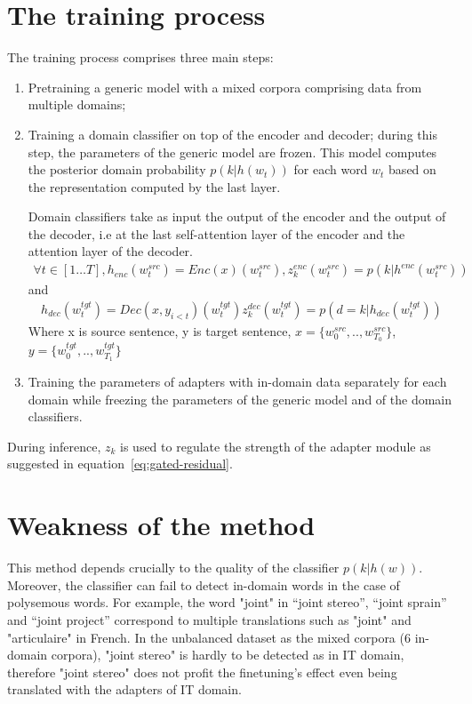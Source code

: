 \documentclass[12pt,times,a4paper,twoside]{article}
\newcommand{\fyTodo}[1]{\Todo[FY:]{\textcolor{orange}{#1}}}
\newcommand{\fyDone}[1]{\done[FY]\Todo[FY:]{\textcolor{orange}{#1}}}
\theoremstyle{definition}
\begin{document}
\section*{The training process}
The training process comprises three main steps:
\begin{enumerate}
\item Pretraining a generic model with a mixed corpora comprising data from multiple domains;
\item Training a domain classifier on top of the encoder and decoder; during this step, the parameters of the generic model are frozen. This model computes the posterior domain probability $p(k|h(w_t))$ for each word $w_t$ based on the representation computed by the last layer.
  
  Domain classifiers take as input the output of the encoder and the output of the decoder, i.e at the last self-attention layer of the encoder and the attention layer of the decoder. \fyDone{Next sentence is a repetition}
  \begin{align}
    \forall t \in [1 \dots T], h_{enc}(w^{src}_t) = Enc(x)(w^{src}_t), z^{enc}_k(w^{src}_t) = p(k| h^{enc}(w^{src}_t))
  \end{align}
  \fyTodo{what are x and y ?}
  and
  \begin{align}
    h_{dec}(w^{tgt}_t)=Dec(x, y_{i<t})(w^{tgt}_t)  z^{dec}_k(w^{tgt}_t) = p(d=k| h_{dec}(w^{tgt}_t))
  \end{align}
  Where x is source sentence, y is target sentence, $x=\lbrace w^{src}_0,..,w^{src}_{T_0}\rbrace$, $y=\lbrace w^{tgt}_0,..,w^{tgt}_{T_1} \rbrace$
  
\item Training the parameters of adapters with in-domain data separately for each domain while freezing the parameters of the generic model and of the domain classifiers.
\end{enumerate}

During inference, $z_k$ is used to regulate the strength of the adapter module as suggested in equation~\ref{eq:gated-residual}.

\section*{Weakness of the method}

This method\fyTodo{Do not start with the weaknesses} depends crucially to the quality of the classifier $p(k|h(w))$. Moreover, the classifier can fail to detect in-domain words in the case of polysemous words. For example, the word "joint" in ``joint stereo'', ``joint sprain'' and ``joint project'' correspond to multiple translations such as "joint" and "articulaire" in French. In the unbalanced dataset as the mixed corpora (6 in-domain corpora),  "joint stereo" is hardly to be detected as in IT domain, therefore "joint stereo" does not profit the finetuning's effect even being translated with the adapters of IT domain.
\end{document}
